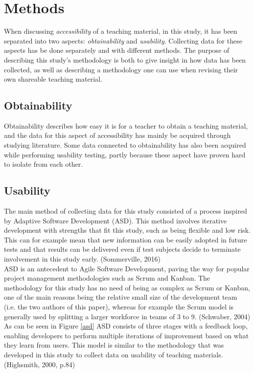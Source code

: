 \chapter{Methods}
When discussing \textit{accessibility} of a teaching material, in this study, it has been separated into two aspects: \textit{obtainability} and \textit{usability}. Collecting data for these aspects has be done separately and with different methods. The purpose of describing this study's methodology is both to give insight in how data has been collected, as well as describing a methodology one can use when revising their own shareable teaching material.

\section{Obtainability}
Obtainability describes how easy it is for a teacher to obtain a teaching material, and the data for this aspect of accessibility has mainly be acquired through studying literature. Some data connected to obtainability has also been acquired while performing usability testing, partly because these aspect have proven hard to isolate from each other.

\section{Usability}
The main method of collecting data for this study consisted of a process inspired by Adaptive Software Development (ASD). This method involves iterative development with strengths that fit this study, such as being flexible and low risk. This can for example mean that new information
can be easily adopted in future tests and that results can be delivered even if test subjects decide to terminate involvement in this study early. (Sommerville, 2016)\\
ASD is an antecedent to Agile Software Development, paving the way for popular project management methodologies such as Scrum and Kanban. The methodology for this study has no need of being as complex as Scrum or Kanban, one of the main reasons being the relative small size of the development team (i.e. the two authors of this paper), whereas for example the Scrum model is generally used by splitting a larger workforce in teams of 3 to 9. (Schwaber, 2004)\\
As can be seen in Figure \ref{asd} ASD consists of three stages with a feedback loop, enabling developers to perform multiple iterations of improvement based on what they learn from users. This model is similar to the methodology that was developed in this study to collect data on usability of teaching materials. (Highsmith, 2000, p.84)\\

